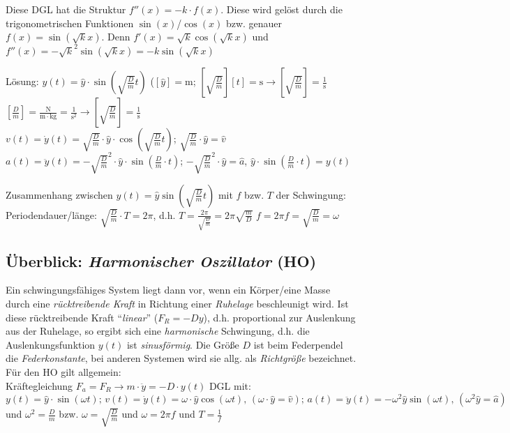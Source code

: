 \documentclass[a4paper]{scrartcl}
\begin{document}
Diese DGL hat die Struktur $f''(x) = -k \cdot f(x)$. Diese wird gelöst durch
die trigonometrischen Funktionen $\sin(x)$/$\cos(x)$ bzw. genauer $f(x) =
\sin(\sqrt{k}x)$. Denn $f'(x) = \sqrt{k} \cos(\sqrt{k}x)$ und $f''(x) =
-\sqrt{k}^2 \sin(\sqrt{k}x) = -k \sin(\sqrt{k}x)$

Lösung: $y(t) = \hat{y} \cdot \sin(\sqrt{\frac{D}{m}}t)$ ($[\hat{y}] =
\mathrm{m}$; $[\sqrt{\frac{D}{m}}][t] = \mathrm{s} \rightarrow
[\sqrt{\frac{D}{m}}] = \frac{1}{\mathrm{s}}$
\\
$[\frac{D}{m}] = \frac{\mathrm{N}}{\mathrm{m \cdot kg}} =
\frac{1}{\mathrm{s^2}} \rightarrow [\sqrt{\frac{D}{m}}] = \frac{1}{\mathrm{s}}$
\\
$v(t) = \dot{y}(t) = \sqrt{\frac{D}{m}} \cdot \hat{y} \cdot
\cos(\sqrt{\frac{D}{m}}t)$; $\sqrt{\frac{D}{m}} \cdot \hat{y} = \hat{v}$
\\
$a(t) = \ddot{y}(t) = -\sqrt{\frac{D}{m}}^2 \cdot \hat{y} \cdot
\sin(\frac{D}{m} \cdot t)$; $-\sqrt{\frac{D}{m}}^2 \cdot \hat{y} = \hat{a}$,
$\hat{y} \cdot \sin(\frac{D}{m} \cdot t) = y(t)$

Zusammenhang zwischen $y(t) = \hat{y} \sin(\sqrt{\frac{D}{m}} t)$ mit $f$ bzw.
$T$ der Schwingung: Periodendauer/länge: $\sqrt{\frac{D}{m}} \cdot T = 2 \pi$,
d.h. $T=\frac{2 \pi}{\sqrt{\frac{D}{m}}} = 2 \pi \sqrt{\frac{m}{D}}$ $f=2 \pi f
= \sqrt{\frac{D}{m}} = \omega$

\subsection{Überblick: \emph{Harmonischer Oszillator} (HO)}
Ein schwingungsfähiges System liegt dann vor, wenn ein Körper/eine Masse durch
eine \emph{rücktreibende Kraft} in Richtung einer \emph{Ruhelage} beschleunigt
wird. Ist diese rücktreibende Kraft "`\emph{linear}"' ($F_R=-Dy$), d.h.
proportional zur Auslenkung aus der Ruhelage, so ergibt sich eine
\emph{harmonische} Schwingung, d.h. die Auslenkungsfunktion $y(t)$ ist
\emph{sinusförmig}. Die Größe $D$ ist beim Federpendel die
\emph{Federkonstante}, bei anderen Systemen wird sie allg. als
\emph{Richtgröße} bezeichnet. Für den HO gilt allgemein:\\
Kräftegleichung $F_a=F_R \rightarrow m \cdot \ddot{y}=-D\cdot y(t)$ DGL mit:
$y(t) = \hat{y} \cdot \sin(\omega t);\, v(t) = \dot{y}(t) = \omega \cdot
\hat{y} \cos(\omega t),\, (\omega \cdot \hat{y}=\hat{v});\, a(t)=\ddot{y}(t) =
- \omega^2 \hat{y} \sin(\omega t),\, (\omega^2 \hat{y}=\hat{a})$ und
$\omega^2=\frac{D}{m}$ bzw. $\omega=\sqrt{\frac{D}{m}}$ und $\omega = 2 \pi f$
und $T = \frac{1}{f}$
\end{document}

